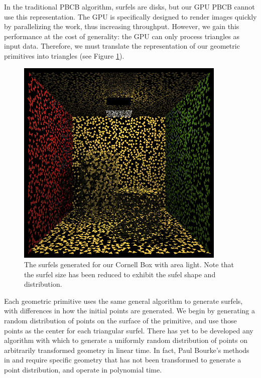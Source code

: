 In the traditional PBCB algorithm, surfels are disks, but our GPU PBCB cannot use this representation. The GPU is specifically designed to render images quickly by parallelizing the work, thus increasing throughput. However, we gain this performance at the cost of generality: the GPU can only process triangles as input data. Therefore, we must translate the representation of our geometric primitives into triangles (see Figure \ref{fig:surfelcloud}).

\begin{figure}[h!]
   \centering
   \includegraphics[width=100mm]{../img/cornell_simp_area_surfelcloud.png}
   \captionfonts
   \caption[Cornell Box with area light surfels]{The surfels generated for our Cornell Box with area light. Note that the surfel size has been reduced to exhibit the sufel shape and distribution.}
   \label{fig:surfelcloud}
\end{figure}

Each geometric primitive uses the same general algorithm to generate surfels, with differences in how the initial points are generated. We begin by generating a random distribution of points on the surface of the primitive, and use those points as the center for each triangular surfel. There has yet to be developed any algorithm with which to generate a uniformly random distribution of points on arbitrarily transformed geometry in linear time. In fact, Paul Bourke's methods in \cite{bib:bourke_spheregen} and \cite{bib:bourke_pointdist} require specific geometry that has not been transformed to generate a point distribution, and operate in polynomial time.

